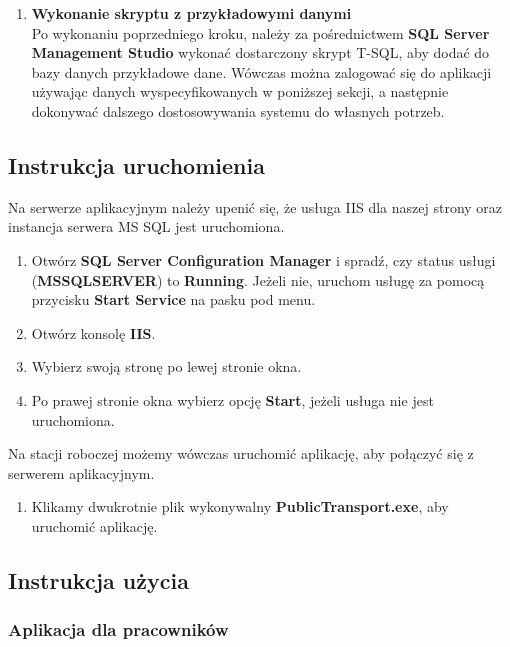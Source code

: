 \documentclass[10pt,a4paper]{article}
\begin{document}
\begin{enumerate}
	\item \textbf{Wykonanie skryptu z przykładowymi danymi} \\
	Po wykonaniu poprzedniego kroku, należy za pośrednictwem \textbf{SQL Server Management Studio} wykonać dostarczony skrypt T-SQL, aby dodać do bazy danych przykładowe dane. Wówczas można zalogować się do aplikacji używając danych wyspecyfikowanych w poniższej sekcji, a następnie dokonywać dalszego dostosowywania systemu do własnych potrzeb.
\end{enumerate}

\subsection{Instrukcja uruchomienia}
Na serwerze aplikacyjnym należy upenić się, że usługa IIS dla naszej strony oraz instancja serwera MS SQL jest uruchomiona. 
\begin{enumerate}
	\item Otwórz \textbf{SQL Server Configuration Manager} i spradź, czy status usługi (\textbf{MSSQLSERVER}) to \textbf{Running}. Jeżeli nie, uruchom usługę za pomocą przycisku \textbf{Start Service} na pasku pod menu.
	\item Otwórz konsolę \textbf{IIS}.
	\item Wybierz swoją stronę po lewej stronie okna.
	\item Po prawej stronie okna wybierz opcję \textbf{Start}, jeżeli usługa nie jest uruchomiona.
\end{enumerate}
Na stacji roboczej możemy wówczas uruchomić aplikację, aby połączyć się z serwerem aplikacyjnym.
\begin{enumerate}
	\item Klikamy dwukrotnie plik wykonywalny \textbf{PublicTransport.exe}, aby uruchomić aplikację.
\end{enumerate}

\subsection{Instrukcja użycia}

\subsubsection{Aplikacja dla pracowników}
\end{document}
